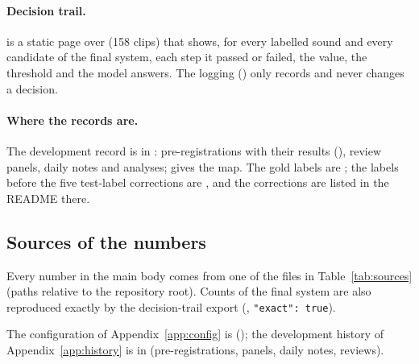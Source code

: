 \paragraph{Decision trail.}  is a static page over  (158 clips) that shows, for every
labelled sound and every candidate of the final system, each step it passed or failed, the value, the threshold and the
model answers. The logging () only records and never changes a decision.

\paragraph{Where the records are.} The development record is in : pre-registrations with their results
(), review panels, daily notes and analyses;  gives the map. The
gold labels are ; the labels before the five test-label corrections are
, and the corrections are listed in the README there.

\subsection{Sources of the numbers}
Every number in the main body comes from one of the files in Table~\ref{tab:sources} (paths relative to the repository root). Counts of the
final system are also reproduced exactly by the decision-trail export (,
\texttt{"exact": true}).

The configuration of Appendix~\ref{app:config} is  (); the development history of Appendix~\ref{app:history} is in  (pre-registrations, panels, daily notes, reviews).

